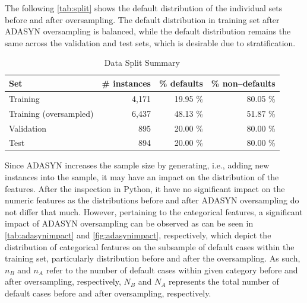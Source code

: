 The following \autoref{tab:split} shows the default distribution of the individual sets before and after oversampling. The default distribution in training set after ADASYN oversampling is balanced, while the default distribution remains the same across the validation and test sets, which is desirable due to stratification.
\begin{table}[H]
\small
\setlength{\tabcolsep}{8pt}
\renewcommand{\arraystretch}{1.3}
\centering
    \caption[Data Split Summary]{Data Split Summary}\label{tab:split}
    \begin{tabular}{lrrr}
\toprule
\textbf{Set} & \textbf{\# instances} & \textbf{\% defaults} & \textbf{\% non--defaults}\\
\midrule
\hline
Training & 4,171  & 19.95 \% & 80.05 \% \\
Training (oversampled) & 6,437 &  48.13 \% & 51.87 \% \\

Validation & 895 &  20.00 \% & 80.00 \% \\

Test & 894 &  20.00 \% & 80.00 \% \\
\hline
\bottomrule
\end{tabular}
\vspace{0.7em}

\vspace{-1em}
\end{table}

Since ADASYN increases the sample size by generating, i.e., adding new instances into the sample, it may have an impact on the distribution of the features.
After the inspection in Python, it have no significant impact on the numeric features as the distributions before and after ADASYN oversampling do not differ that much.
However, pertaining to the categorical features, a significant impact of ADASYN oversampling can be observed as can be seen in  \autoref{tab:adasynimpact} and \autoref{fig:adasynimpact}, respectively, which depict the distribution of categorical features on the subsample of default cases within the training set, particularly distribution before and after the oversampling.
As such, $n_B$ and $n_A$ refer to the number of default cases within given category before and after oversampling, respectively, $N_B$ and $N_A$ represents the total number of default cases before and after oversampling, respectively.

